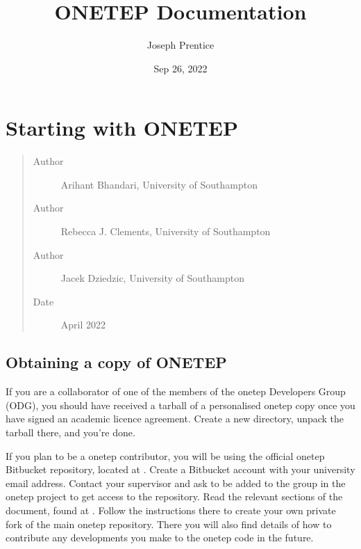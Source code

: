 \documentclass[letterpaper,10pt,english]{sphinxmanual}
\title{ONETEP Documentation}
\date{Sep 26, 2022}
\author{Joseph Prentice}
\begin{document}
\maketitle
\sphinxtableofcontents
{}\label{\detokenize{index::doc}}



\chapter{Starting with ONETEP}
\label{\detokenize{starting_with_onetep:welcome-to-onetep-s-documentation}}\label{\detokenize{starting_with_onetep::doc}}\label{\detokenize{starting_with_onetep:starting-with-onetep}}\begin{quote}\begin{description}
\item[{Author}] \leavevmode
Arihant Bhandari, University of Southampton

\item[{Author}] \leavevmode
Rebecca J. Clements, University of Southampton

\item[{Author}] \leavevmode
Jacek Dziedzic, University of Southampton

\item[{Date}] \leavevmode
April 2022

\end{description}\end{quote}


\section{Obtaining a copy of ONETEP}
\label{\detokenize{starting_with_onetep:obtaining-a-copy-of-onetep}}
If you are a collaborator of one of the members of the onetep Developers
Group (ODG), you should have received a tarball of a personalised onetep
copy once you have signed an academic licence agreement. Create a new
directory, unpack the tarball there, and you’re done.

If you plan to be a onetep contributor, you will be using the official
onetep Bitbucket repository, located at
. Create a Bitbucket account with
your university email address. Contact your supervisor and ask to be
added to the  group in the onetep project to get access
to the repository. Read the relevant sections of the 
document, found at
.
Follow the instructions there to create your own private fork of the
main onetep repository. There you will also find details of how to
contribute any developments you make to the onetep code in the future.
\end{document}
